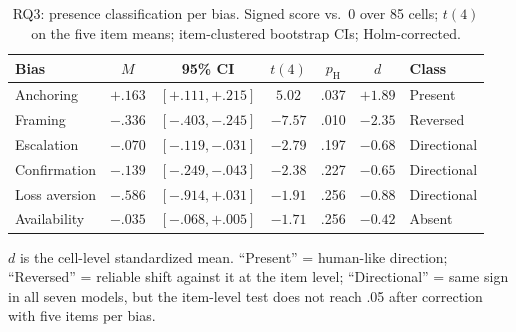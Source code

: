 \begin{table}[!t]
\centering
\caption{RQ3: presence classification per bias. Signed score vs.\ 0 over 85 cells; $t(4)$ on the five item means; item-clustered bootstrap CIs; Holm-corrected.}
\label{tab:rq3}
\footnotesize
\setlength{\tabcolsep}{1.9pt}
\begin{tabular}{lcccccl}
\hline
Bias & $M$ & 95\% CI & $t(4)$ & $p_{\text{H}}$ & $d$ & Class \\
\hline
Anchoring & $+.163$ & $[+.111, +.215]$ & $5.02$ & .037 & $+1.89$ & Present \\
Framing & $-.336$ & $[-.403, -.245]$ & $-7.57$ & .010 & $-2.35$ & Reversed \\
Escalation & $-.070$ & $[-.119, -.031]$ & $-2.79$ & .197 & $-0.68$ & Directional \\
Confirmation & $-.139$ & $[-.249, -.043]$ & $-2.38$ & .227 & $-0.65$ & Directional \\
Loss aversion & $-.586$ & $[-.914, +.031]$ & $-1.91$ & .256 & $-0.88$ & Directional \\
Availability & $-.035$ & $[-.068, +.005]$ & $-1.71$ & .256 & $-0.42$ & Absent \\
\hline
\end{tabular}
\par\smallskip\footnotesize $d$ is the cell-level standardized mean. ``Present'' = human-like direction; ``Reversed'' = reliable shift against it at the item level; ``Directional'' = same sign in all seven models, but the item-level test does not reach .05 after correction with five items per bias.
\end{table}
